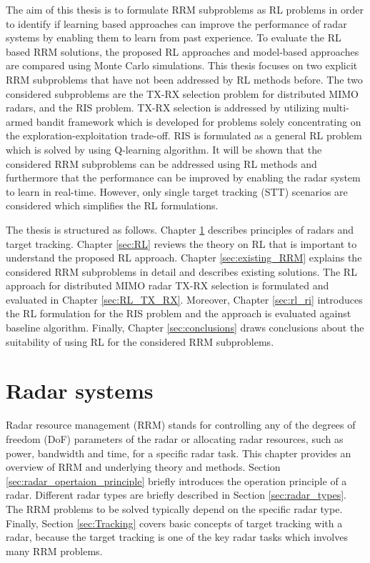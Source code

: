 \documentclass[english, 12pt, a4paper, elec, utf8, a-1b, online]{aaltothesis}
\begin{document}
The aim of this thesis is to formulate RRM subproblems as RL problems in order to identify if learning based approaches can improve the performance of radar systems by enabling them to learn from past experience. 
To evaluate the RL based RRM solutions, the proposed RL approaches and model-based approaches are compared using Monte Carlo simulations. 
This thesis focuses on two explicit RRM subproblems that have not been addressed by RL methods before. 
The two considered subproblems are the TX-RX selection problem for distributed MIMO radars, and the RIS problem.
TX-RX selection is addressed by utilizing multi-armed bandit framework which is developed for problems solely concentrating on the exploration-exploitation trade-off. 
RIS is formulated as a general RL problem which is solved by using Q-learning algorithm.
It will be shown that the considered RRM subproblems can be addressed using RL methods and furthermore that the performance can be improved by enabling the radar system to learn in real-time.
However, only single target tracking (STT) scenarios are considered which simplifies the RL formulations. 

The thesis is structured as follows. Chapter \ref{sec:background} describes principles of radars and target tracking. Chapter \ref{sec:RL} reviews the theory on RL that is important to understand the proposed RL approach. 
Chapter \ref{sec:existing_RRM} explains the considered RRM subproblems in detail and describes existing solutions.
The RL approach for distributed MIMO radar TX-RX selection is formulated and evaluated in Chapter \ref{sec:RL_TX_RX}. Moreover,  Chapter \ref{sec:rl_ri} introduces the RL formulation for the RIS problem and the approach is evaluated against baseline algorithm. 
Finally, Chapter \ref{sec:conclusions} draws conclusions about the suitability of using RL for the considered RRM subproblems. 


\clearpage
\section{Radar systems}\label{sec:background}

Radar resource management (RRM) stands for controlling any of the degrees of freedom (DoF) parameters of the radar or allocating radar resources, such as power, bandwidth and time, for a specific radar task.
This chapter provides an overview of RRM and underlying theory and methods.
Section \ref{sec:radar_opertaion_principle} briefly introduces the operation principle of a radar.
Different radar types are briefly described in Section \ref{sec:radar_types}. 
The RRM problems to be solved typically depend on the specific radar type. 
Finally, Section \ref{sec:Tracking} covers basic concepts of target tracking with a radar, because the target tracking is one of the key radar tasks which involves many RRM problems.
\end{document}
